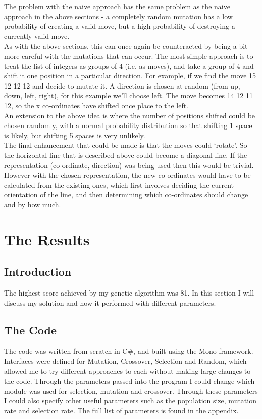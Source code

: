 \documentclass[]{report}
\begin{document}
The problem with the naive approach has the same problem as the naive approach in the above sections - a completely random mutation has a low probability of creating a valid move, but a high probability of destroying a currently valid move.\\

As with the above sections, this can once again be counteracted by being a bit more careful with the mutations that can occur. The most simple approach is to treat the list of integers as groups of 4 (i.e. as moves), and take a group of 4 and shift it one position in a particular direction. For example, if we find the move 15 12 12 12 and decide to mutate it. A direction is chosen at random (from up, down, left, right), for this example we'll choose left. The move becomes 14 12 11 12, so the x co-ordinates have shifted once place to the left.\\

An extension to the above idea is where the number of positions shifted could be chosen randomly, with a normal probability distribution so that shifting 1 space is likely, but shifting 5 spaces is very unlikely.\\

The final enhancement that could be made is that the moves could `rotate'. So the horizontal line that is described above could become a diagonal line. If the representation (co-ordinate, direction) was being used then this would be trivial. However with the chosen representation, the new co-ordinates would have to be calculated from the existing ones, which first involves deciding the current orientation of the line, and then determining which co-ordinates should change and by how much.


\chapter{The Results}

\section{Introduction}
The highest score achieved by my genetic algorithm was 81. In this section I will discuss my solution and how it performed with different parameters.\\

\section{The Code}
The code was written from scratch in C\#, and built using the Mono framework. Interfaces were defined for Mutation, Crossover, Selection and Random, which allowed me to try different approaches to each without making large changes to the code. Through the parameters passed into the program I could change which module was used for selection, mutation and crossover. Through these parameters I could also specify other useful parameters such as the population size, mutation rate and selection rate. The full list of parameters is found in the appendix.
\end{document}

